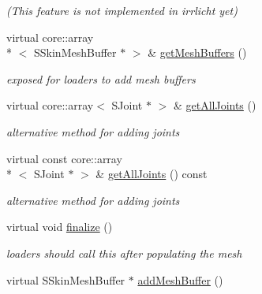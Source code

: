 \begin{DoxyCompactItemize}
\begin{DoxyCompactList}\small\item\em (This feature is not implemented in irrlicht yet) \end{DoxyCompactList}\item 
\hypertarget{classirr_1_1scene_1_1_c_skinned_mesh_ac857de913041104dd672c6912a253e50}{virtual core\-::array\\*
$<$ S\-Skin\-Mesh\-Buffer $\ast$ $>$ \& \hyperlink{classirr_1_1scene_1_1_c_skinned_mesh_ac857de913041104dd672c6912a253e50}{get\-Mesh\-Buffers} ()}\label{classirr_1_1scene_1_1_c_skinned_mesh_ac857de913041104dd672c6912a253e50}

\begin{DoxyCompactList}\small\item\em exposed for loaders to add mesh buffers \end{DoxyCompactList}\item 
\hypertarget{classirr_1_1scene_1_1_c_skinned_mesh_ac41b7fd1d76feda1e59f2b5f5b124340}{virtual core\-::array$<$ S\-Joint $\ast$ $>$ \& \hyperlink{classirr_1_1scene_1_1_c_skinned_mesh_ac41b7fd1d76feda1e59f2b5f5b124340}{get\-All\-Joints} ()}\label{classirr_1_1scene_1_1_c_skinned_mesh_ac41b7fd1d76feda1e59f2b5f5b124340}

\begin{DoxyCompactList}\small\item\em alternative method for adding joints \end{DoxyCompactList}\item 
\hypertarget{classirr_1_1scene_1_1_c_skinned_mesh_a269617e28d6748b6ffbd06166cbdd898}{virtual const core\-::array\\*
$<$ S\-Joint $\ast$ $>$ \& \hyperlink{classirr_1_1scene_1_1_c_skinned_mesh_a269617e28d6748b6ffbd06166cbdd898}{get\-All\-Joints} () const }\label{classirr_1_1scene_1_1_c_skinned_mesh_a269617e28d6748b6ffbd06166cbdd898}

\begin{DoxyCompactList}\small\item\em alternative method for adding joints \end{DoxyCompactList}\item 
\hypertarget{classirr_1_1scene_1_1_c_skinned_mesh_a34670046e0cfc3e8fc29bbe52b296973}{virtual void \hyperlink{classirr_1_1scene_1_1_c_skinned_mesh_a34670046e0cfc3e8fc29bbe52b296973}{finalize} ()}\label{classirr_1_1scene_1_1_c_skinned_mesh_a34670046e0cfc3e8fc29bbe52b296973}

\begin{DoxyCompactList}\small\item\em loaders should call this after populating the mesh \end{DoxyCompactList}\item 
\hypertarget{classirr_1_1scene_1_1_c_skinned_mesh_ae6919ee05202cee8a2c4016f5cede810}{virtual S\-Skin\-Mesh\-Buffer $\ast$ \hyperlink{classirr_1_1scene_1_1_c_skinned_mesh_ae6919ee05202cee8a2c4016f5cede810}{add\-Mesh\-Buffer} ()}\label{classirr_1_1scene_1_1_c_skinned_mesh_ae6919ee05202cee8a2c4016f5cede810}


\end{DoxyCompactItemize}
